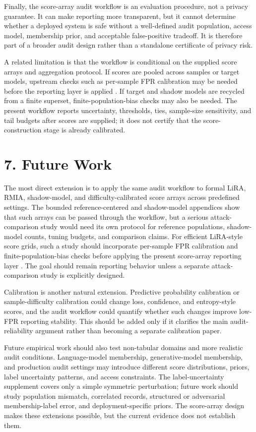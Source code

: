 \documentclass[
  10pt,
  twocolumn]{article}
\begin{document}
Finally, the score-array audit workflow is an evaluation procedure, not a privacy guarantee. It can make reporting more transparent, but it cannot determine whether a deployed system is safe without a well-defined audit population, access model, membership prior, and acceptable false-positive tradeoff. It is therefore part of a broader audit design rather than a standalone certificate of privacy risk.

A related limitation is that the workflow is conditional on the supplied score arrays and aggregation protocol. If scores are pooled across samples or target models, upstream checks such as per-sample FPR calibration may be needed before the reporting layer is applied \cite{ref-12}. If target and shadow models are recycled from a finite superset, finite-population-bias checks may also be needed. The present workflow reports uncertainty, thresholds, ties, sample-size sensitivity, and tail budgets after scores are supplied; it does not certify that the score-construction stage is already calibrated.

\hypertarget{future-work}{%
\section{7. Future Work}\label{future-work}}

The most direct extension is to apply the same audit workflow to formal LiRA, RMIA, shadow-model, and difficulty-calibrated score arrays across predefined settings. The bounded reference-centered and shadow-model appendices show that such arrays can be passed through the workflow, but a serious attack-comparison study would need its own protocol for reference populations, shadow-model counts, tuning budgets, and comparison claims. For efficient LiRA-style score grids, such a study should incorporate per-sample FPR calibration and finite-population-bias checks before applying the present score-array reporting layer \cite{ref-12}. The goal should remain reporting behavior unless a separate attack-comparison study is explicitly designed.

Calibration is another natural extension. Predictive probability calibration or sample-difficulty calibration could change loss, confidence, and entropy-style scores, and the audit workflow could quantify whether such changes improve low-FPR reporting stability. This should be added only if it clarifies the main audit-reliability argument rather than becoming a separate calibration paper.

Future empirical work should also test non-tabular domains and more realistic audit conditions. Language-model membership, generative-model membership, and production audit settings may introduce different score distributions, priors, label uncertainty patterns, and access constraints. The label-uncertainty supplement covers only a simple symmetric perturbation; future work should study population mismatch, correlated records, structured or adversarial membership-label error, and deployment-specific priors. The score-array design makes these extensions possible, but the current evidence does not establish them.
\end{document}
